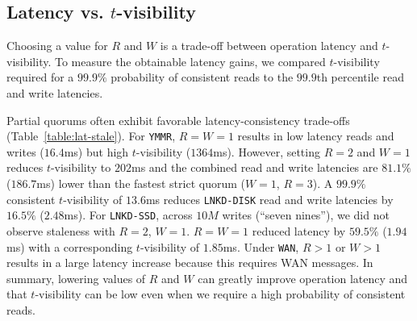 \documentclass{vldb}
\newcommand{\subsectionskip}{-0em}
\begin{document}
\vspace{\subsectionskip}\subsection{Latency vs. {\large $t$}-visibility}

Choosing a value for $R$ and $W$ is a trade-off between operation
latency and $t$-visibility. To measure the obtainable latency gains,
we compared $t$-visibility required for a $99.9\%$ probability of
consistent reads to the $99.9$th percentile read and write latencies.

Partial quorums often exhibit favorable latency-consistency trade-offs
(Table~\ref{table:lat-stale}).  For \texttt{YMMR}, $R$$=$$W$$=$$1$
results in low latency reads and writes ($16.4$ms) but high
$t$-visibility ($1364$ms). However, setting $R$$=$$2$ and $W$$=$$1$
reduces $t$-visibility to $202$ms and the combined read and write
latencies are $81.1\%$ ($186.7$ms) lower than the fastest strict
quorum ($W$$=$$1$, $R$$=$$3$).  A $99.9\%$ consistent $t$-visibility of
$13.6$ms reduces \texttt{LNKD-DISK} read and write latencies by
$16.5\%$ ($2.48$ms).  For \texttt{LNKD-SSD}, across $10M$ writes
(``seven nines''), we did not observe staleness with $R$$=$$2$,
$W$$=$$1$.  $R$$=$$W$$=$$1$ reduced latency by $59.5\%$ ($1.94$ms)
with a corresponding $t$-visibility of $1.85$ms.  Under \texttt{WAN},
$R > 1$ or $W > 1$ results in a large latency increase because this
requires WAN messages. In summary, lowering values of $R$ and $W$ can
greatly improve operation latency and that $t$-visibility can be low
even when we require a high probability of consistent reads.
\end{document}
